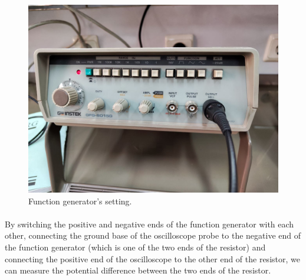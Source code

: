 \documentclass[11pt]{article}
\newcommand{\PicScale}{0.2}
\begin{document}
\begin{question}
{        \begin{figure}[H]
            \begin{center}
                \includegraphics[scale=\PicScale]{Fig/32.jpeg}
                \caption{Function generator's setting.}
            \end{center}
        \end{figure}

        \paragraph*{}
        By switching the positive and negative ends of the function generator with each other, connecting the ground base of the oscilloscope probe to the negative end of the function generator (which is one of the two ends of the resistor) and connecting the positive end of the oscilloscope to the other end of the resistor, we can measure the potential difference between the two ends of the resistor.

}
\end{question}
\end{document}

